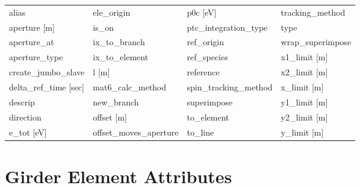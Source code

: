  \begin{tabular}{llll} \toprule
alias                            & ele_origin                       & p0c [eV]                         & tracking_method                  \\
aperture [m]                     & is_on                            & ptc_integration_type             & type                             \\
aperture_at                      & ix_to_branch                     & ref_origin                       & wrap_superimpose                 \\
aperture_type                    & ix_to_element                    & ref_species                      & x1_limit [m]                     \\
create_jumbo_slave               & l [m]                            & reference                        & x2_limit [m]                     \\
delta_ref_time [sec]             & mat6_calc_method                 & spin_tracking_method             & x_limit [m]                      \\
descrip                          & new_branch                       & superimpose                      & y1_limit [m]                     \\
direction                        & offset [m]                       & to_element                       & y2_limit [m]                     \\
e_tot [eV]                       & offset_moves_aperture            & to_line                          & y_limit [m]                      \\
 \bottomrule
 \end{tabular}
 \vfill
 
 \section{Girder Element Attributes}
 \label{s:list.girder}
 
